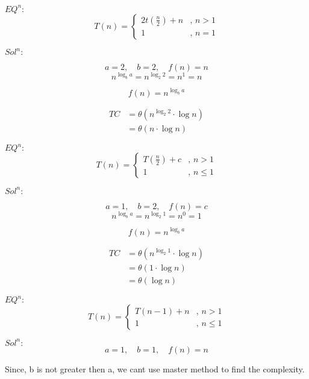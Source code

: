 \documentclass{article}
\begin{document}
$EQ^n:$
\[
    T(n) = 
    \begin{cases}
        2t\left(\frac{n}{2}\right) + n & \text{, } n > 1 \\
        1 & \text{, } n = 1
    \end{cases}
\]

$Sol^n:$

\[
    a = 2, \quad b = 2, \quad f(n) = n
\]
\[
    n^{\log_b a} = n^{\log_2 2} = n^1 = n
\]

\[
    f(n) = n^{\log_b a}
\]

\begin{align*}
    TC &= \theta (n^{\log_2 2} \cdot \log n) \\
       &= \theta (n \cdot \log n) 
\end{align*}

\hrulefill
\vspace*{10pt}


$EQ^n:$
\[
    T(n) = 
    \begin{cases}
        T\left(\frac{n}{2}\right) + c & \text{, } n > 1 \\
        1 & \text{, } n \leq 1
    \end{cases}
\]

$Sol^n:$

\[
    a = 1, \quad b = 2, \quad f(n) = c
\]
\[
    n^{\log_b a} = n^{\log_2 1} = n^0 = 1
\]

\[
    f(n) = n^{\log_b a}
\]

\begin{align*}
    TC &= \theta (n^{\log_2 1} \cdot \log n) \\
       &= \theta (1 \cdot \log n)\\
       &= \theta (\log n)
\end{align*}

\hrulefill
\vspace*{10pt}

$EQ^n:$
\[
    T(n) = 
    \begin{cases}
        T\left({n-1}\right) + n & \text{, } n > 1 \\
        1 & \text{, } n \leq 1
    \end{cases}
\]

$Sol^n:$
\[
    a = 1, \quad b = 1, \quad f(n) = n
\]  

Since, b is not greater then a, we cant use master method to find the complexity.

\hrulefill
\newpage
\end{document}
